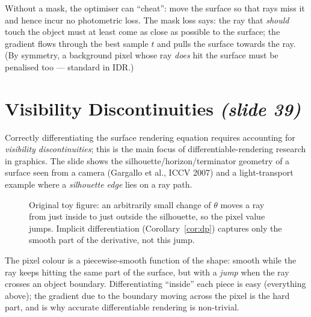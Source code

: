 \documentclass[11pt,a4paper]{article}
\theoremstyle{definition}
\theoremstyle{plain}
\theoremstyle{remark}
\begin{document}
\begin{intuition}
Without a mask, the optimiser can ``cheat'': move the surface so that rays miss it and hence incur no photometric loss.
The mask loss says: the ray that \emph{should} touch the object must at least come as close as possible to the surface;
the gradient flows through the best sample $t$ and pulls the surface towards the ray. (By symmetry, a background
pixel whose ray \emph{does} hit the surface must be penalised too --- standard in IDR.)
\end{intuition}

\section{Visibility Discontinuities \emph{(slide 39)}}
Correctly differentiating the surface rendering equation requires accounting for \emph{visibility discontinuities}; this is
the main focus of differentiable-rendering research in graphics. The slide shows the silhouette/horizon/terminator
geometry of a surface seen from a camera (Gargallo et al., ICCV 2007) and a light-transport example where a
\emph{silhouette edge} lies on a ray path.


\begin{figure}[htbp]
\centering
{}
\caption{Original toy figure: an arbitrarily small change of $\theta$ moves a ray from just inside to just outside the silhouette,
so the pixel value jumps. Implicit differentiation (Corollary~\ref{cor:dp}) captures only the smooth part of the derivative, not this jump.}
\end{figure}

\begin{intuition}
The pixel colour is a piecewise-smooth function of the shape: smooth while the ray keeps hitting the same
part of the surface, but with a \emph{jump} when the ray crosses an object boundary. Differentiating ``inside'' each piece is
easy (everything above); the gradient due to the boundary moving across the pixel is the hard part, and is why
accurate differentiable rendering is non-trivial.
\end{intuition}
\end{document}
